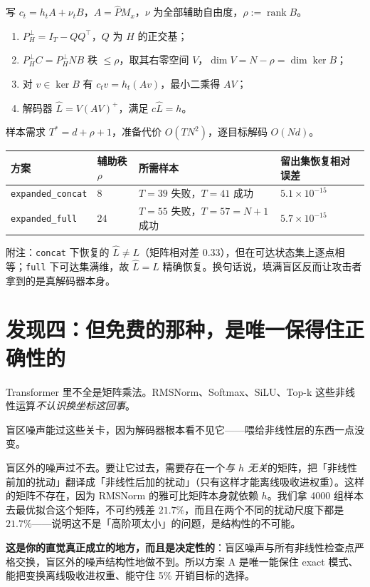 \documentclass[UTF8, fontset=macnew, 11pt]{ctexart}
\newcommand{\Ph}{\hat P}
\begin{document}
\begin{mathbox}[已知明文闭式恢复]
写 $c_t=h_tA+\nu_tB$，$A=\Ph M_x$，$\nu$ 为全部辅助自由度，$\rho:=\operatorname{rank}B$。
\begin{enumerate}[label=\arabic*.]
  \item $P_H^\perp=I_T-QQ^{\!\top}$，$Q$ 为 $H$ 的正交基；
  \item $P_H^\perp C=P_H^\perp NB$ 秩 $\le\rho$，取其右零空间 $V$，$\dim V=N-\rho=\dim\ker B$；
  \item 对 $v\in\ker B$ 有 $c_tv=h_t(Av)$，最小二乘得 $AV$；
  \item 解码器 $\hat L=V(AV)^{+}$，满足 $c\hat L=h$。
\end{enumerate}
样本需求 $T^{*}=d+\rho+1$，准备代价 $O(TN^2)$，逐目标解码 $O(Nd)$。
\end{mathbox}

\begin{numbox}
\begin{tabular}{@{}llll@{}}
\toprule
方案 & 辅助秩 $\rho$ & 所需样本 & 留出集恢复相对误差 \\
\midrule
\texttt{expanded\_concat} & $8$  & $T{=}39$ 失败，$T{=}41$ 成功 & $5.1\times10^{-15}$ \\
\texttt{expanded\_full}   & $24$ & $T{=}55$ 失败，$T{=}57{=}N{+}1$ 成功 & $5.7\times10^{-15}$ \\
\bottomrule
\end{tabular}

\smallskip
附注：\texttt{concat} 下恢复的 $\hat L\ne L$（矩阵相对差 $0.33$），但在可达状态集上逐点相等；\texttt{full} 下可达集满维，故 $\hat L=L$ 精确恢复。换句话说，填满盲区反而让攻击者拿到的是真解码器本身。
\end{numbox}

\section{发现四：但免费的那种，是唯一保得住正确性的}

\begin{plainbox}
Transformer 里不全是矩阵乘法。RMSNorm、Softmax、SiLU、Top-k 这些非线性运算\emph{不认识换坐标这回事}。

盲区噪声能过这些关卡，因为解码器根本看不见它——喂给非线性层的东西一点没变。

盲区外的噪声过不去。要让它过去，需要存在一个\emph{与 $h$ 无关}的矩阵，把「非线性前加的扰动」翻译成「非线性后加的扰动」（只有这样才能离线吸收进权重）。这样的矩阵不存在，因为 RMSNorm 的雅可比矩阵本身就依赖 $h$。我们拿 4000 组样本去最优拟合这个矩阵，不可约残差 $21.7\%$，而且在两个不同的扰动尺度下都是 $21.7\%$——说明这不是「高阶项太小」的问题，是结构性的不可能。

\textbf{这是你的直觉真正成立的地方，而且是决定性的}：盲区噪声与所有非线性检查点严格交换，盲区外的噪声结构性地做不到。所以方案 A 是唯一能保住 exact 模式、能把变换离线吸收进权重、能守住 5\% 开销目标的选择。
\end{plainbox}
\end{document}
